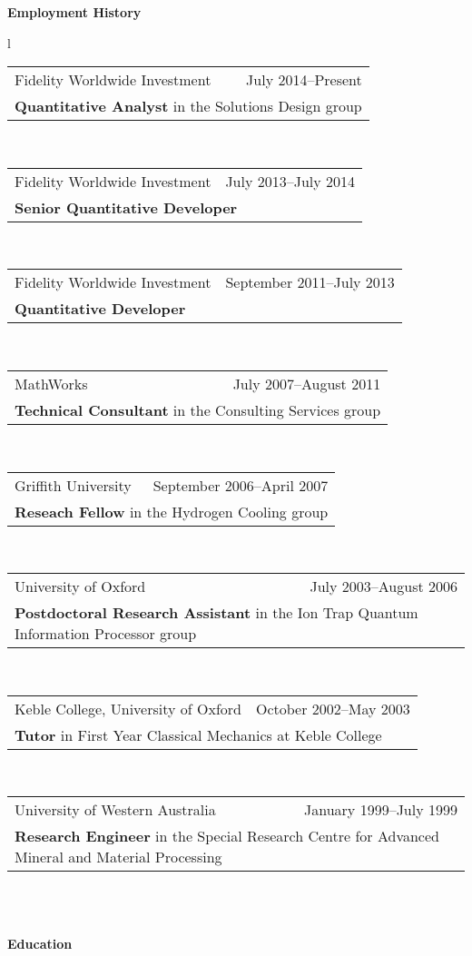 \documentclass[10pt,a4paper]{article}
\makeatletter
\newcommand{\role}[5]{
\begin{tabular*}{150mm}{l@{\extracolsep{\fill}}r}
#5 & #1--#2 \\ 
\multicolumn{2}{p{140mm}}{\textbf{#3}{#4}} 
\end{tabular*}
\vspace{0.8mm}
 }
\makeatother
\begin{document}
\vspace{0.1in}
{\large \textbf{Employment History}}\\
\vspace{0.1in}
\begin{tabular}{l}
  \role{July 2014}{Present}{Quantitative Analyst}{ in the Solutions Design
  group}{Fidelity Worldwide Investment} \\
  \role{July 2013}{July 2014}{Senior Quantitative Developer}{}
    {Fidelity Worldwide Investment} \\
  \role{September 2011}{July 2013}{Quantitative Developer}{}
    {Fidelity Worldwide Investment} \\
  \role{July 2007}{August 2011}{Technical Consultant}{ in the Consulting
  Services group}{MathWorks} \\
  \role{September 2006}{April 2007}{Reseach Fellow}{ in the Hydrogen
  Cooling group}{Griffith University} \\
  \role{July 2003}{August 2006}{Postdoctoral Research Assistant}{ in the
    Ion Trap Quantum Information Processor group}{University of Oxford} \\
  \role{October 2002}{May 2003}{Tutor}{ in First Year Classical Mechanics at
  Keble College}{Keble College, University of Oxford}\\
  \role{January 1999}{July 1999}{Research Engineer}{ in the 
      Special Research Centre for Advanced Mineral and Material
      Processing}{University of Western Australia}\\
\end{tabular}
\\
\vspace{0.1in}
{\large \textbf{Education}}\\
\vspace{0.1in}
\end{document}
